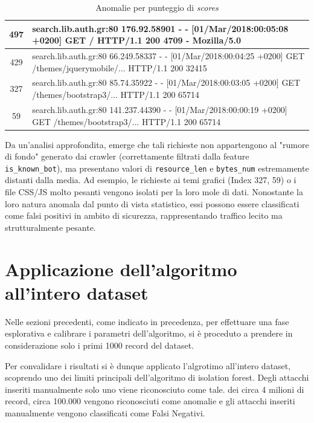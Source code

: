 \begin{table}[H]
{\begin{tabular}{|c|p{20cm}|}
                  497            & {\ttfamily search.lib.auth.gr:80 176.92.58901 - - [01/Mar/2018:00:05:08 +0200] GET / HTTP/1.1 200 4709 - Mozilla/5.0}                                       \\ \hline
                  429            & {\ttfamily search.lib.auth.gr:80 66.249.58337 - - [01/Mar/2018:00:04:25 +0200] GET /themes/jquerymobile/... HTTP/1.1 200 32415}                             \\ \hline
                  327            & {\ttfamily search.lib.auth.gr:80 85.74.35922 - - [01/Mar/2018:00:03:05 +0200] GET /themes/bootstrap3/... HTTP/1.1 200 65714}                                \\ \hline
                  59             & {\ttfamily search.lib.auth.gr:80 141.237.44390 - - [01/Mar/2018:00:00:19 +0200] GET /themes/bootstrap3/... HTTP/1.1 200 65714}                              \\ \hline
            \end{tabular}
      }
      \caption{Anomalie per punteggio di \emph{scores}}
\end{table}


Da un'analisi approfondita, emerge che tali richieste non appartengono al "rumore di fondo" generato dai crawler (correttamente filtrati dalla feature \\ \texttt{is\_known\_bot}), ma presentano valori di \texttt{resource\_len} e \texttt{bytes\_num} estremamente distanti dalla media. Ad esempio, le richieste ai temi grafici (Index 327, 59) o i file CSS/JS molto pesanti vengono isolati per la loro mole di dati. Nonostante la loro natura anomala dal punto di vista statistico, essi possono essere classificati come falsi positivi in ambito di sicurezza, rappresentando traffico lecito ma strutturalmente pesante.

\section{Applicazione dell'algoritmo all'intero dataset}

Nelle sezioni precedenti, come indicato in precedenza, per effettuare una fase esplorativa e calibrare i parametri dell'algoritmo, si è proceduto a prendere in considerazione solo i primi 1000 record del dataset.

Per convalidare i risultati si è dunque applicato l'algrotimo all'intero dataset, scoprendo uno dei limiti principali dell'algoritmo di isolation forest. Degli attacchi inseriti manualmente solo uno viene riconosciuto come tale. dei circa 4 milioni di record, circa 100.000 vengono riconosciuti come anomalie e gli attacchi inseriti manualmente vengono classificati come Falsi Negativi.

